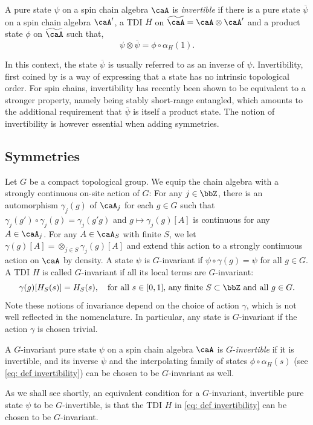 %
%
%
\begin{definition}
	A pure state $\psi$ on a spin chain algebra $\caA$ is \emph{invertible} if there is a pure state $\overline{\psi}$ on a spin chain algebra $\caA'$, a TDI $H$ on $\widetilde \caA= \caA \otimes \caA'$ and a product state $\phi$ on $\widetilde \caA$ such that, 
	\begin{equation}\label{eq: def invertibility}
		\psi\otimes\overline{\psi} =\phi \circ \alpha_H(1).
	\end{equation}
\end{definition}
%
%
%
In this context, the state $\overline{\psi}$ is usually referred to as an inverse of $\psi$.  Invertibility, first coined by \cite{KitaevConf} is a way of expressing that a state has no intrinsic topological order. For spin chains, invertibility has recently been shown \cite{kapustin2021classification} to be equivalent to a stronger property, namely being stably short-range entangled, which amounts to the additional requirement that $\overline{\psi}$ is itself a product state. The notion of invertibility is however essential when adding symmetries. 


\subsection{Symmetries}\label{sec: symmetries}
Let $G$ be a compact topological group. We equip the chain algebra with a strongly continuous on-site action of $G$: For any $j\in \bbZ$, there is an automorphism $\gamma_{j}(g)$ of $\caA_j$ for each $g\in G$ such that $\gamma_{j}(g')\circ \gamma_{j}(g)=\gamma_{j}(g'g)$ and $g\mapsto \gamma_j(g)[A]$ is continuous for any $A\in \caA_j$. For any $A\in\caA_S$ with finite $S$, we let $\gamma(g)[A]=\otimes_{j\in S}\gamma_{j}(g)[A]$ and extend this action to a strongly continuous action  on $\caA$ by density. A state $\psi$ is $G$-invariant if  $\psi \circ \gamma(g)=\psi$ for all $g\in G$. 
A TDI $H$ is called $G$-invariant if all its local terms are $G$-invariant: 
$$
\gamma(g)[H_S(s)]=H_S(s), \quad \text{for all $s\in[0,1]$, any finite $S \subset \bbZ$ and all $g\in G$}.
$$
Note these notions of invariance depend on the choice of action $\gamma$, which is not well reflected in the nomenclature. In particular, any state is $G$-invariant if the action $\gamma$ is chosen trivial. 

\begin{definition}
	A $G$-invariant pure state $\psi$ on a spin chain algebra $\caA$ is $G$-\emph{invertible} if it is invertible, and its inverse $\overline{\psi}$ and the interpolating family of states $\phi\circ\alpha_H(s)$ (see \eqref{eq: def invertibility}) can be chosen to be $G$-invariant as well. 
\end{definition}
As we shall see shortly, an equivalent condition for a $G$-invariant, invertible pure state $\psi$ to be $G$-invertible, is that the TDI $H$ in \eqref{eq: def invertibility} can be chosen to be $G$-invariant.  




